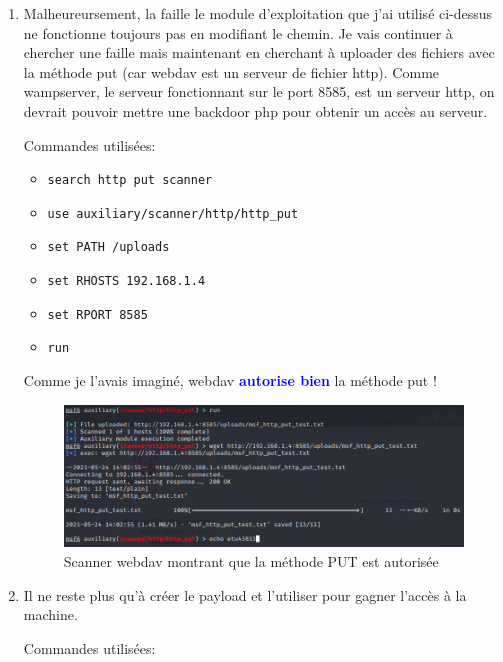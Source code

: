 \documentclass[a4paper]{article}
\begin{document}
\begin{enumerate}
\begin{figure}[H]
        \label{fig:webDavEnabled}
    \end{figure}
    \item Malheureursement, la faille le module d'exploitation que j'ai utilisé ci-dessus ne fonctionne toujours pas en modifiant le chemin. Je vais continuer à chercher une faille mais maintenant en cherchant à uploader des fichiers avec la méthode put (car webdav est un serveur de fichier http). Comme wampserver, le serveur fonctionnant sur le port 8585, est un serveur http, on devrait pouvoir mettre une backdoor php pour obtenir un accès au serveur.
    \begin{example}
        Commandes utilisées:
        \begin{itemize}
            \item \texttt{\footnotesize search http put scanner}
            \item \texttt{\footnotesize use auxiliary/scanner/http/http\_put}
            \item \texttt{\footnotesize set PATH /uploads}
            \item \texttt{\footnotesize set RHOSTS 192.168.1.4}
            \item \texttt{\footnotesize set RPORT 8585}
            \item \texttt{\footnotesize run}
        \end{itemize}
        Comme je l'avais imaginé, webdav \textcolor{blue}{\textbf{autorise bien}} la méthode put !
    \end{example}
    \begin{figure}[H]
        \centering
        \includegraphics[width=0.85\linewidth]{images/webdav-put-scanner.PNG}
        \caption{Scanner webdav montrant que la méthode PUT est autorisée}
        \label{fig:webdavPut}
    \end{figure}
    \item Il ne reste plus qu'à créer le payload et l'utiliser pour gagner l'accès à la machine.
    \begin{example}
        Commandes utilisées:
        \begin{itemize}

\end{itemize}
\end{example}
\end{enumerate}
\end{document}
